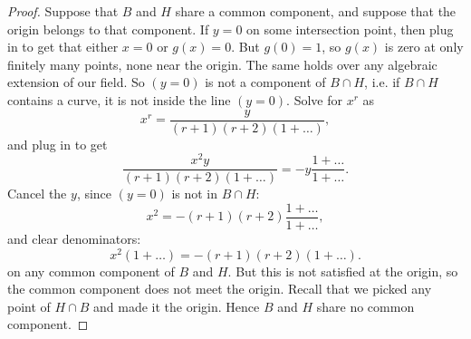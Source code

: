 \begin{proof}
Suppose that \(B\) and \(H\) share a common component, and suppose that the origin belongs to that component.
If \(y=0\) on some intersection point, then plug in to get that either \(x=0\) or \(g(x)=0\).
But \(g(0)=1\), so \(g(x)\) is zero at only finitely many points, none near the origin.
The same holds over any algebraic extension of our field.
So \((y=0)\) is not a component of \(B \cap H\), i.e. if \(B \cap H\) contains a curve, it is not inside the line \((y=0)\).
Solve for \(x^r\) as
\[
x^r=\frac{y}{(r+1)(r+2)(1+\dots)},
\]
and plug in to get
\[
\frac{x^2 y}{(r+1)(r+2)(1+\dots)} = -y\frac{1+\dots}{1+\dots}.
\]
Cancel the \(y\), since \((y=0)\) is not in \(B \cap H\):
\[
x^2 = -(r+1)(r+2)\frac{1+\dots}{1+\dots},
\]
and clear denominators:
\[
x^2(1+\dots)=-(r+1)(r+2)(1+\dots).
\]
on any common component of \(B\) and \(H\).
But this is not satisfied at the origin, so the common component does not meet the origin.
Recall that we picked any point of \(H \cap B\) and made it the origin.
Hence \(B\) and \(H\) share no common component.


\end{proof}
